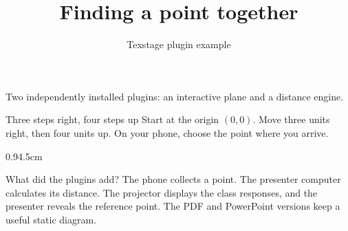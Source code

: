 \documentclass[aspectratio=169]{beamer}
\title{Finding a point together}
\author{Texstage plugin example}
\begin{document}
\begin{frame}
  \titlepage
  Two independently installed plugins: an interactive plane and a distance engine.
\end{frame}
\begin{frame}{Three steps right, four steps up}
  Start at the origin $(0,0)$. Move three units right, then four units up.
  On your phone, choose the point where you arrive.
  \begin{coordinatesplane}[id=walk,answer-x=3,answer-y=4]{0.9\textwidth}{4.5cm}
  \end{coordinatesplane}
\end{frame}
\begin{frame}{What did the plugins add?}
  The phone collects a point. The presenter computer calculates its distance.
  The projector displays the class responses, and the presenter reveals the reference point.
  \medskip
  The PDF and PowerPoint versions keep a useful static diagram.
\end{frame}
\end{document}
